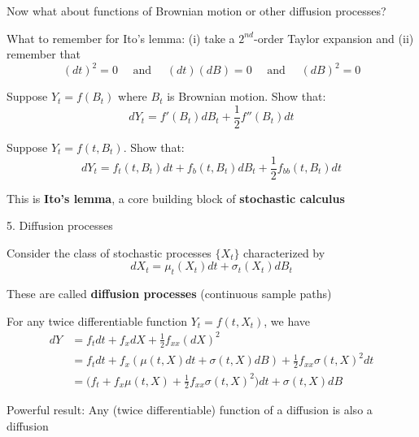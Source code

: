 \documentclass[11pt, aspectratio=169]{beamer}
\newenvironment{witemize}{\itemize\addtolength{\itemsep}{10pt}}{\enditemize}
\begin{document}
\begin{frame}{}

\begin{witemize}
\item Now what about functions of Brownian motion or other diffusion processes? 

\item What to remember for Ito's lemma: (i) take a $2^{nd}$-order Taylor expansion and (ii) remember that 
\begin{equation*}
	(dt)^2 = 0
	\quad \text{ and } \quad
	(dt)(dB) = 0
	\quad \text{ and } \quad
	(dB)^2 = 0
\end{equation*}

\item Suppose $Y_t = f(B_t)$ where $B_t$ is Brownian motion. Show that:
\begin{equation*}
	dY_t = f'(B_t) dB_t + \frac{1}{2} f''(B_t) dt 
\end{equation*}

\item Suppose $Y_t = f(t, B_t)$. Show that:
\begin{equation*}
	dY_t = f_t(t, B_t) dt + f_b(t, B_t) dB_t + \frac{1}{2} f_{bb}(t, B_t) dt 
\end{equation*}

\item This is \textbf{Ito's lemma}, a core building block of \textbf{stochastic calculus}

\end{witemize}
\end{frame}


\begin{frame}{5. Diffusion processes}
\begin{witemize}
\item Consider the class of stochastic processes $\{X_t\}$ characterized by 
\begin{equation*}
	dX_t = \mu_t(X_t) dt + \sigma_t(X_t) dB_t
\end{equation*}

\item These are called \textbf{diffusion processes} (continuous sample paths)

\item For any twice differentiable function $Y_t = f(t, X_t)$, we have
	\begin{align*}
		dY &= f_t dt + f_x dX + \frac{1}{2} f_{xx} (dX)^2 \\
		&= f_t dt + f_x (\mu(t, X) dt + \sigma(t, X) dB) + \frac{1}{2} f_{xx} \sigma(t, X)^2 dt \\
		&= \Big( f_t + f_x \mu(t, X) + \frac{1}{2} f_{xx} \sigma(t, X)^2 \Big) dt + \sigma(t, X) dB
	\end{align*}

\item Powerful result: Any (twice differentiable) function of a diffusion is also a diffusion
\end{witemize}
\end{frame}
\end{document}
